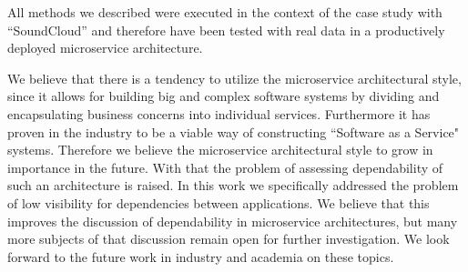 All methods we described were executed in the context of the case study with ``SoundCloud'' and therefore have been tested with real data in a productively deployed microservice architecture.

We believe that there is a tendency to utilize the microservice architectural style, since it allows for building big and complex software systems by dividing and encapsulating business concerns into individual services. Furthermore it has proven in the industry to be a viable way of constructing ``Software as a Service" systems. Therefore we believe the microservice architectural style to grow in importance in the future. With that the problem of assessing dependability of such an architecture is raised. In this work we specifically addressed the problem of low visibility for dependencies between applications. We believe that this improves the discussion of dependability in microservice architectures, but many more subjects of that discussion remain open for further investigation. We look forward to the future work in industry and academia on these topics.

\scalebox{.02}{Zweifel. Conquered at last.}